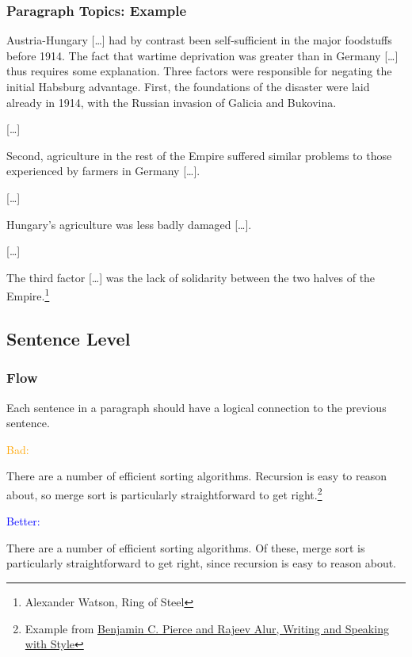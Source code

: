 \documentclass[xetex]{beamer}
\newcommand{\bad}[1]{\textcolor{orange}{#1}}
\newcommand{\good}[1]{\textcolor{blue}{#1}}
\begin{document}
\begin{frame}
  \frametitle{Paragraph Topics: Example}

  \small
  Austria-Hungary [\dots] had by contrast been self-sufficient in the major foodstuffs before 1914.
  The fact that wartime deprivation was greater than in Germany [\dots] thus requires some explanation.
  Three factors were responsible for negating the initial Habsburg advantage.
  First, the foundations of the disaster were laid already in 1914, with the Russian invasion of Galicia and Bukovina.

  [\dots]

  Second, agriculture in the rest of the Empire suffered similar problems to those experienced by farmers in Germany [\dots].

  [\dots]

  Hungary's agriculture was less badly damaged [\dots].

  [\dots]

  The third factor [\dots] was the lack of solidarity between the two halves of the Empire.\footnote{Alexander Watson, Ring of Steel}
\end{frame}

\subsection{Sentence Level}

\begin{frame}
  \frametitle{Flow}

  Each sentence in a paragraph should have a logical connection to the previous sentence.

  \medskip
  \pause

  \bad{Bad:}

  {
    \small
    There are a number of efficient sorting algorithms.
    Recursion is easy to reason about, so merge sort is particularly straightforward to get right.\footnote{Example from \href{https://docs.google.com/document/d/1_vBXbugoLjO171w3wovs3ugmRQI-O6EcSVFDBF7eUzE/edit}{Benjamin C. Pierce and Rajeev Alur, Writing and Speaking with Style}}
  }

  \medskip
  \pause

  \good{Better:}

  {
    \small
    There are a number of efficient sorting algorithms.
    Of these, merge sort is particularly straightforward to get right, since recursion is easy to reason about.
  }
\end{frame}
\end{document}
